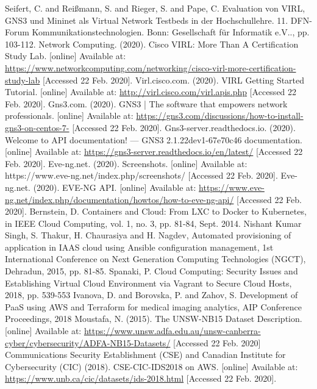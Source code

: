 \documentclass[conference]{IEEEtran}
\begin{document}
\begin{thebibliography}{00}
 Seifert, C. and Reißmann, S. and Rieger, S. and Pape, C. Evaluation von VIRL, GNS3 und Mininet als Virtual Network Testbeds in der Hochschullehre. 11. DFN-Forum Kommunikationstechnologien. Bonn: Gesellschaft für Informatik e.V.., pp. 103-112.
 Network Computing. (2020). Cisco VIRL: More Than A Certification Study Lab. [online] Available at: \url{https://www.networkcomputing.com/networking/cisco-virl-more-certification-study-lab} [Accessed 22 Feb. 2020].
 Virl.cisco.com. (2020). VIRL Getting Started Tutorial. [online] Available at: \url{http://virl.cisco.com/virl.apis.php} [Accessed 22 Feb. 2020].
 Gns3.com. (2020). GNS3 | The software that empowers network professionals. [online] Available at: \url{https://gns3.com/discussions/how-to-install-gns3-on-centos-7-} [Accessed 22 Feb. 2020].
 Gns3-server.readthedocs.io. (2020). Welcome to API documentation! — GNS3 2.1.22dev1-67e70c46 documentation. [online] Available at: \url{https://gns3-server.readthedocs.io/en/latest/} [Accessed 22 Feb. 2020].
 Eve-ng.net. (2020). Screenshots. [online] Available at: https://www.eve-ng.net/index.php/screenshots/ [Accessed 22 Feb. 2020].
 Eve-ng.net. (2020). EVE-NG API. [online] Available at: \url{https://www.eve-ng.net/index.php/documentation/howtos/how-to-eve-ng-api/} [Accessed 22 Feb. 2020].
 Bernstein, D. Containers and Cloud: From LXC to Docker to Kubernetes, in IEEE Cloud Computing, vol. 1, no. 3, pp. 81-84, Sept. 2014.
 Nishant Kumar Singh, S. Thakur, H. Chaurasiya and H. Nagdev, Automated provisioning of application in IAAS cloud using Ansible configuration management, 1st International Conference on Next Generation Computing Technologies (NGCT), Dehradun, 2015, pp. 81-85.
 Spanaki, P. Cloud Computing: Security Issues and Establishing Virtual Cloud Environment via Vagrant to Secure Cloud Hosts, 2018, pp. 539-553
 Ivanova, D. and Borovska, P. and Zahov, S. Development of PaaS using AWS and Terraform for medical imaging analytics, AIP Conference Proceedings, 2018
 Moustafa, N. (2015). The UNSW-NB15 Dataset Description. [online] Available at: \url{https://www.unsw.adfa.edu.au/unsw-canberra-cyber/cybersecurity/ADFA-NB15-Datasets/} [Accessed 22 Feb. 2020]
 Communications Security Establishment (CSE) and Canadian Institute for Cybersecurity (CIC) (2018). CSE-CIC-IDS2018 on AWS. [online] Available at: \url{https://www.unb.ca/cic/datasets/ids-2018.html} [Accessed 22 Feb. 2020].

\end{thebibliography}
\end{document}
